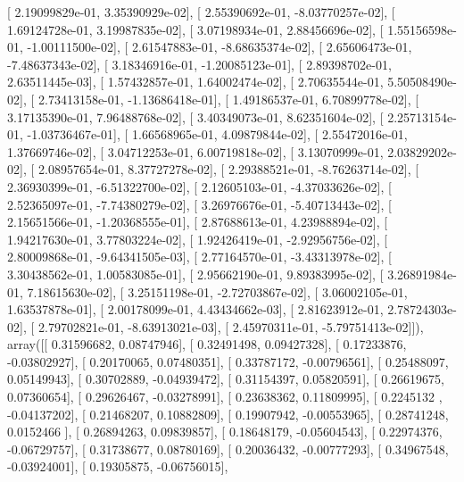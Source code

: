 \documentclass{article}
\begin{document}
       [  2.19099829e-01,   3.35390929e-02],
       [  2.55390692e-01,  -8.03770257e-02],
       [  1.69124728e-01,   3.19987835e-02],
       [  3.07198934e-01,   2.88456696e-02],
       [  1.55156598e-01,  -1.00111500e-02],
       [  2.61547883e-01,  -8.68635374e-02],
       [  2.65606473e-01,  -7.48637343e-02],
       [  3.18346916e-01,  -1.20085123e-01],
       [  2.89398702e-01,   2.63511445e-03],
       [  1.57432857e-01,   1.64002474e-02],
       [  2.70635544e-01,   5.50508490e-02],
       [  2.73413158e-01,  -1.13686418e-01],
       [  1.49186537e-01,   6.70899778e-02],
       [  3.17135390e-01,   7.96488768e-02],
       [  3.40349073e-01,   8.62351604e-02],
       [  2.25713154e-01,  -1.03736467e-01],
       [  1.66568965e-01,   4.09879844e-02],
       [  2.55472016e-01,   1.37669746e-02],
       [  3.04712253e-01,   6.00719818e-02],
       [  3.13070999e-01,   2.03829202e-02],
       [  2.08957654e-01,   8.37727278e-02],
       [  2.29388521e-01,  -8.76263714e-02],
       [  2.36930399e-01,  -6.51322700e-02],
       [  2.12605103e-01,  -4.37033626e-02],
       [  2.52365097e-01,  -7.74380279e-02],
       [  3.26976676e-01,  -5.40713443e-02],
       [  2.15651566e-01,  -1.20368555e-01],
       [  2.87688613e-01,   4.23988894e-02],
       [  1.94217630e-01,   3.77803224e-02],
       [  1.92426419e-01,  -2.92956756e-02],
       [  2.80009868e-01,  -9.64341505e-03],
       [  2.77164570e-01,  -3.43313978e-02],
       [  3.30438562e-01,   1.00583085e-01],
       [  2.95662190e-01,   9.89383995e-02],
       [  3.26891984e-01,   7.18615630e-02],
       [  3.25151198e-01,  -2.72703867e-02],
       [  3.06002105e-01,   1.63537878e-01],
       [  2.00178099e-01,   4.43434662e-03],
       [  2.81623912e-01,   2.78724303e-02],
       [  2.79702821e-01,  -8.63913021e-03],
       [  2.45970311e-01,  -5.79751413e-02]]), array([[ 0.31596682,  0.08747946],
       [ 0.32491498,  0.09427328],
       [ 0.17233876, -0.03802927],
       [ 0.20170065,  0.07480351],
       [ 0.33787172, -0.00796561],
       [ 0.25488097,  0.05149943],
       [ 0.30702889, -0.04939472],
       [ 0.31154397,  0.05820591],
       [ 0.26619675,  0.07360654],
       [ 0.29626467, -0.03278991],
       [ 0.23638362,  0.11809995],
       [ 0.2245132 , -0.04137202],
       [ 0.21468207,  0.10882809],
       [ 0.19907942, -0.00553965],
       [ 0.28741248,  0.0152466 ],
       [ 0.26894263,  0.09839857],
       [ 0.18648179, -0.05604543],
       [ 0.22974376, -0.06729757],
       [ 0.31738677,  0.08780169],
       [ 0.20036432, -0.00777293],
       [ 0.34967548, -0.03924001],
       [ 0.19305875, -0.06756015],
\end{document}
